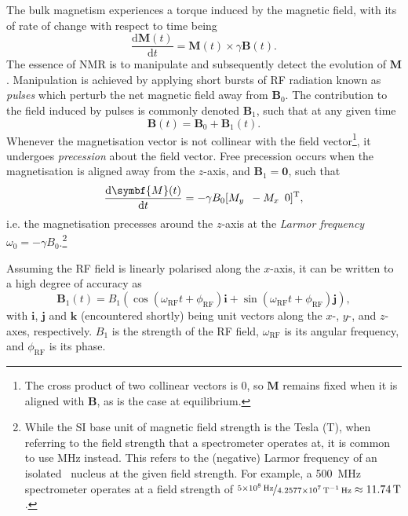 The bulk magnetism experiences a torque induced by the magnetic field, with its
of rate of change with respect to time being
\begin{equation}
  \frac{\mathrm{d}\symbf{M}(t)}{\mathrm{d}t} = \symbf{M}(t) \times \gamma \symbf{B}(t).
  \label{eq:M-cross-B}
\end{equation}
The essence of \ac{NMR} is to manipulate and subsequently detect the evolution
of $\symbf{M}$. Manipulation is achieved by applying short bursts of \ac{RF}
radiation known as \emph{pulses} which perturb the net magnetic field away from
$\symbf{B}_0$. The contribution to the field induced by pulses is commonly
denoted $\symbf{B}_1$, such that at any given time
\begin{equation}
    \symbf{B}(t) = \symbf{B}_0 + \symbf{B}_1(t).
\end{equation}
Whenever the magnetisation vector is not collinear with the field vector\footnote{
    The cross product of two collinear vectors is $0$, so $\symbf{M}$ remains
    fixed when it is aligned with $\symbf{B}$, as is the case at equilibrium.
}, it
undergoes \emph{precession} about the field vector. Free precession occurs
when the magnetisation is aligned away from the $z$-axis, and $\symbf{B}_1 =
\symbf{0}$, such that
\begin{equation}
  \frac{\mathrm{d}\symbf{M}(t)}{\mathrm{d}t} =
  -\gamma B_0 [M_y \hspace*{5pt} -M_x \hspace{5pt} 0]\T,
\end{equation}
i.e. the magnetisation precesses around the $z$-axis at the \emph{Larmor
frequency} $\omega_0 = -\gamma B_0$.\footnote{
    While the SI base unit of magnetic field strength is the Tesla
    (\unit{\tesla}), when referring to the field strength that a spectrometer
    operates at, it is common to use \unit{\mega\hertz} instead. This refers to
    the (negative) Larmor frequency of an isolated \proton\ nucleus at the
    given field strength. For example, a \qty{500}{\mega\hertz} spectrometer
    operates at a field strength of
    $\nicefrac{\qty{5e8}{\hertz}}{\qty{4.2577e7}{\per\tesla\hertz}}
    \approx \qty{11.74}{\tesla}$.
}

Assuming the \ac{RF} field is linearly polarised along the $x$-axis, it can be
written to a high degree of accuracy as
\begin{equation}
    \symbf{B}_1(t) = B_1\left(
        \cos(\omega_{\text{RF}} t + \phi_{\text{RF}}) \symbf{i} +
        \sin(\omega_{\text{RF}} t + \phi_{\text{RF}}) \symbf{j}
    \right),
\end{equation}
with $\symbf{i}$, $\symbf{j}$ and $\symbf{k}$ (encountered shortly) being unit
vectors along the $x$-, $y$-, and $z$-axes, respectively. $B_1$ is the strength
of the \ac{RF} field, $\omega_{\text{RF}}$ is its angular frequency, and
$\phi_{\text{RF}}$ is its phase.

